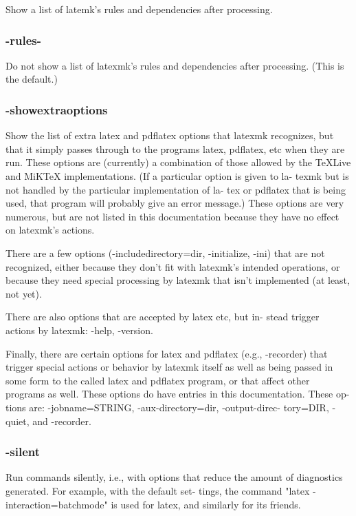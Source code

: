 Show a list of latemk's rules and dependencies after processing.

\subsubsection{-rules-}

Do  not  show  a  list of latexmk's rules and dependencies after
processing.  (This is the default.)


\subsubsection{-showextraoptions}

Show the list of extra latex and pdflatex options  that  latexmk
recognizes,  but  that  it simply passes through to the programs
latex, pdflatex, etc  when they  are  run.   These  options  are
(currently)  a  combination  of those allowed by the TeXLive and
MiKTeX implementations.  (If a particular option is given to la-
texmk but is not handled by the particular implementation of la-
tex or pdflatex that is being used, that program  will  probably
give  an  error  message.)  These options are very numerous, but
are not listed in this documentation because they have no effect
on latexmk's actions.

There  are  a  few  options (-includedirectory=dir, -initialize,
-ini) that are not recognized, either  because  they  don't  fit
with latexmk's intended operations, or because they need special
processing by latexmk that  isn't  implemented  (at  least,  not
yet).

There  are  also options that are accepted by latex etc, but in-
stead trigger actions by latexmk: -help, -version.

Finally, there are certain options for latex and pdflatex (e.g.,
-recorder)  that  trigger special actions or behavior by latexmk
itself as well as being passed in some form to the called  latex
and  pdflatex  program,  or  that affect other programs as well.
These options do have entries in this documentation.  These  op-
tions  are:  -jobname=STRING, -aux-directory=dir, -output-direc-
tory=DIR, -quiet, and -recorder.


\subsubsection{-silent}

Run commands silently, i.e., with options that reduce the amount of
diagnostics  generated.   For example, with the default set- tings, the command
"latex -interaction=batchmode"  is  used  for latex, and similarly for its
friends.

